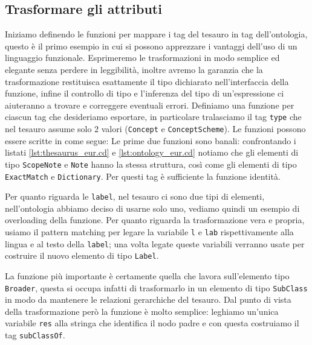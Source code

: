 \subsection{Trasformare gli attributi}
Iniziamo definendo le funzioni per mappare i tag del tesauro in tag dell'ontologia, questo è il primo esempio in cui si possono apprezzare i vantaggi dell'uso di un linguaggio funzionale. Esprimeremo le trasformazioni in modo semplice ed elegante senza perdere in leggibilità, inoltre avremo la garanzia che la trasformazione restituisca esattamente il tipo dichiarato nell'interfaccia della funzione, infine il controllo di tipo e l'inferenza del tipo di un'espressione ci aiuteranno a trovare e correggere eventuali errori. Definiamo una funzione per ciascun tag che desideriamo esportare, in particolare tralasciamo il tag \verb|type| che nel tesauro assume solo 2 valori (\verb|Concept| e \verb|ConceptScheme|). Le funzioni possono essere scritte in \cduce come segue:
Le prime due funzioni sono banali: confrontando i listati \ref{lst:thesaurus_eur.cd} e \ref{lst:ontology_eur.cd} notiamo che gli elementi di tipo \verb|ScopeNote| e \verb|Note| hanno la stessa struttura, così come gli elementi di tipo \verb|ExactMatch| e \verb|Dictionary|. Per questi tag è sufficiente la funzione identità.

Per quanto riguarda le \verb|label|, nel tesauro ci sono due tipi di elementi, nell'ontologia abbiamo deciso di usarne solo uno, vediamo quindi un esempio di overloading della funzione. Per quanto riguarda la trasformazione vera e propria, usiamo il pattern matching per legare la variabile \verb|l| e \verb|lab| rispettivamente alla lingua e al testo della \verb|label|; una volta legate queste variabili verranno usate per costruire il nuovo elemento di tipo \verb|Label|.

La funzione più importante è certamente quella che lavora sull'elemento tipo \verb|Broader|, questa si occupa infatti di trasformarlo in un elemento di tipo \verb|SubClass| in modo da mantenere le relazioni gerarchiche del tesauro. Dal punto di vista della trasformazione però la funzione è molto semplice: leghiamo un'unica variabile \verb|res| alla stringa che identifica il nodo padre e con questa costruiamo il tag \verb|subClassOf|.
